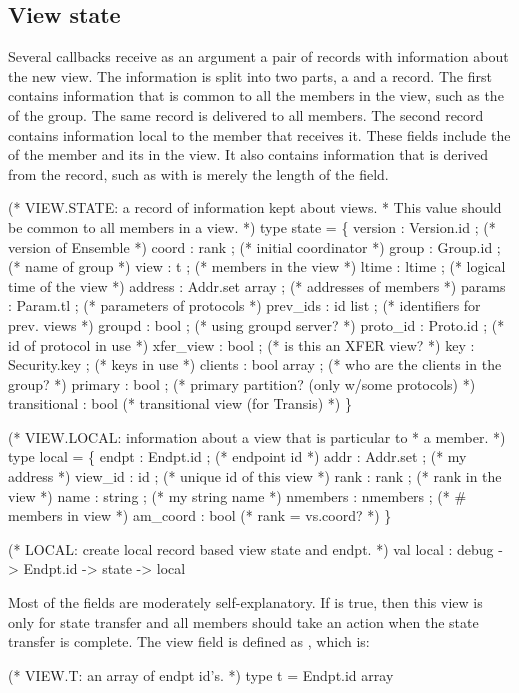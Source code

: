 \subsection{View state}

Several callbacks receive as an argument a pair of records with
information about the new view.  The information is split into two
parts, a  and a  record.  The
first contains information that is common to all the members in the
view, such as the  of the group.  The same record is
delivered to all members.  The second record contains information
local to the member that receives it.  These fields include the
 of the member and its  in the view.  It
also contains information that is derived from the 
record, such as  with is merely the length of the
 field.

\begin{codebox}
(* VIEW.STATE: a record of information kept about views.
 * This value should be common to all members in a view.
 *)
type state = \{
  version       : Version.id ;		(* version of Ensemble *)
  coord         : rank ;		(* initial coordinator *)
  group		: Group.id ;		(* name of group *)
  view 		: t ;			(* members in the view *)
  ltime 	: ltime ;		(* logical time of the view *)
  address       : Addr.set array ;	(* addresses of members *)
  params        : Param.tl ;		(* parameters of protocols *)
  prev_ids      : id list ;             (* identifiers for prev. views *)
  groupd        : bool ;		(* using groupd server? *)
  proto_id	: Proto.id ;		(* id of protocol in use *)
  xfer_view	: bool ;		(* is this an XFER view? *)
  key		: Security.key ;	(* keys in use *)
  clients	: bool array ;		(* who are the clients in the group? *)
  primary       : bool ;		(* primary partition? (only w/some protocols) *)
  transitional  : bool			(* transitional view (for Transis) *)
\}
\end{codebox}

\begin{codebox}
(* VIEW.LOCAL: information about a view that is particular to 
 * a member.
 *)
type local = \{
  endpt	        : Endpt.id ;		(* endpoint id *)
  addr	        : Addr.set ;		(* my address *)
  view_id 	: id ;			(* unique id of this view *)
  rank 	        : rank ;		(* rank in the view *)  
  name		: string ;		(* my string name *)
  nmembers 	: nmembers ;		(* # members in view *)
  am_coord      : bool  		(* rank = vs.coord? *)
\}  

(* LOCAL: create local record based view state and endpt.
 *)
val local : debug -> Endpt.id -> state -> local
\end{codebox}

Most of the fields are moderately self-explanatory.  If
 is true, then this view is only for state transfer
and all members should take an  action when the state
transfer is complete.  The view field is defined as ,
which is:
\begin{codebox}
(* VIEW.T: an array of endpt id's.
 *)
type t = Endpt.id array
\end{codebox}
